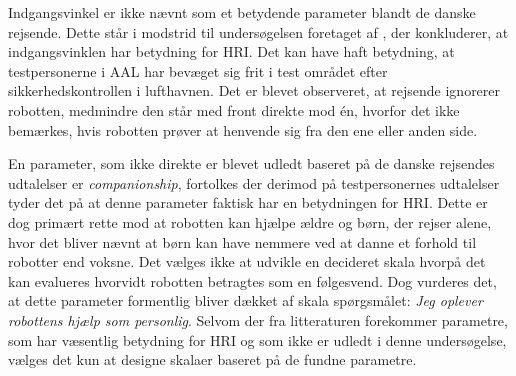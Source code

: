 Indgangsvinkel er ikke nævnt som et betydende parameter blandt de danske rejsende. Dette står i modstrid til undersøgelsen foretaget af \textcite{PDF:HowMayIServeYou}, der konkluderer, at indgangsvinklen har betydning for HRI. Det kan have haft betydning, at testpersonerne i AAL har bevæget sig frit i test området efter sikkerhedskontrollen i lufthavnen. Det er blevet observeret, at rejsende ignorerer robotten, medmindre den står med front direkte mod én, hvorfor det ikke bemærkes, hvis robotten prøver at henvende sig fra den ene eller anden side. 

En parameter, som ikke direkte er blevet udledt baseret på de danske rejsendes udtalelser er \textit{companionship}, fortolkes der derimod på testpersonernes udtalelser tyder det på at denne parameter faktisk har en betydningen for HRI. Dette er dog primært rette mod at robotten kan hjælpe ældre og børn, der rejser alene, hvor det bliver nævnt at børn kan have nemmere ved at danne et forhold til robotter end voksne. Det vælges ikke at udvikle en decideret skala hvorpå det kan evalueres hvorvidt robotten betragtes som en følgesvend. Dog vurderes det, at dette parameter formentlig bliver dækket af skala spørgsmålet: \textit{Jeg oplever robottens hjælp som personlig}. \blankline
%
Selvom der fra litteraturen forekommer parametre, som har væsentlig betydning for HRI og som ikke er udledt i denne undersøgelse, vælges det kun at designe skalaer baseret på de fundne parametre. 
